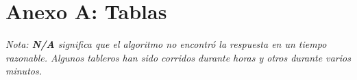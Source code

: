 \documentclass[%
    final,
    reprint,
    notitlepage,
    narroweqnarray,
    inline,
    twoside,
    invited
    ]{ieee}
\begin{document}
%
%
%
%
%











\clearpage


\onecolumn
\section*{Anexo A: Tablas}

\textit{Nota: \textbf{N/A} significa que el algoritmo no encontró la respuesta en un tiempo razonable. Algunos tableros han sido corridos durante horas y otros durante varios minutos.}
\end{document}
